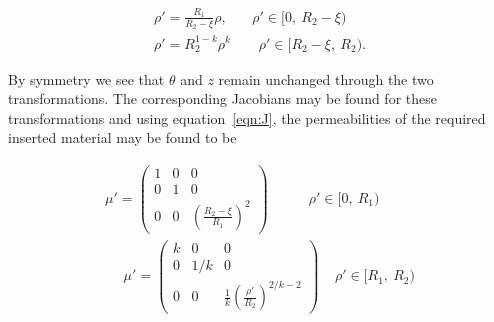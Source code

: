 \documentclass[11pt]{iopart}
\begin{document}
\begin{equation}
  \label{transform}
  \begin{split}
\rho' = \frac{R_1}{R_2-\xi}\rho,~~~~~~~~\rho'\in[0,~R_2-\xi)~~\\
\rho' = R_2^{1-k}\rho^k~~~~~~~~~\rho'\in[R_2-\xi,~R_2).
  \end{split}
\end{equation}

By symmetry we see that $\theta$ and $z$ remain unchanged through the
two transformations. The corresponding Jacobians may be found for
these transformations and using equation~\ref{eqn:J}, the
permeabilities of the required inserted material may be found to be

\begin{equation}
  \label{eqn:mat}
  \begin{split}
 \mu' = \begin{pmatrix}1&0&0\\0&1&0\\0&0&(\frac{R_2-\xi}{R_1})^2\end{pmatrix}~~~~~~~~~~~~~\rho'\in[0,~R_1)~~\\
~~~~~~\mu' = \begin{pmatrix}k&0&0\\0&1/k&0\\0&0&\frac{1}{k}(\frac{\rho'}{R_2})^{2/k-2}\end{pmatrix}~~~~~\rho'\in[R_1,~R_2)
  \end{split}
\end{equation}
\end{document}

